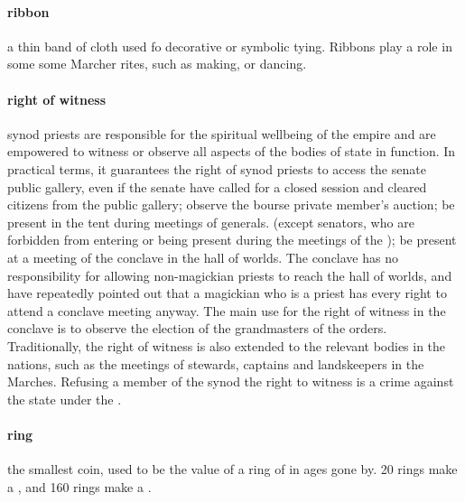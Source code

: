 \paragraph{ribbon} a thin band of cloth used fo decorative or symbolic tying. Ribbons play a role in some some Marcher rites, such as  making,  or  dancing.
\paragraph{right of witness} synod priests are responsible for the spiritual wellbeing of the empire and are empowered to witness or observe all aspects of the bodies of state in function. In practical terms, it guarantees the right of synod priests to access the senate public gallery, even if the senate have called for a closed session and cleared citizens from the public gallery; observe the bourse private member's auction; be present in the  tent during meetings of generals. (except senators, who are forbidden from entering or being present during the meetings of the ); be present at a meeting of the conclave in the hall of worlds. The conclave has no responsibility for allowing non-magickian priests to reach the hall of worlds, and have repeatedly pointed out that a magickian who is a priest has every right to attend a conclave meeting anyway. The main use for the right of witness in the conclave is to observe the election of the grandmasters of the orders. Traditionally, the right of witness is also extended to the relevant bodies in the nations, such as the meetings of stewards, captains and landskeepers in the Marches. Refusing a member of the synod the right to witness is a crime against the state under the . 
\paragraph{ring} the smallest coin, used to be the value of a ring of  in ages gone by. 20 rings make a , and 160 rings make a . 
